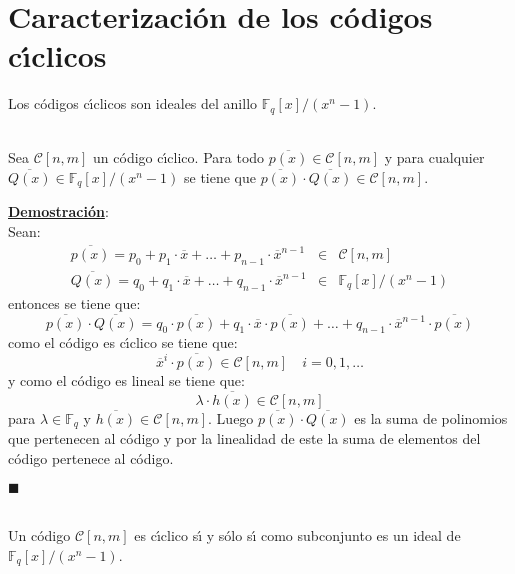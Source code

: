 %
%

\section{Caracterizaci\'on de los c\'odigos c\'{\i}clicos}

Los c\'odigos c\'{\i}clicos son ideales del anillo $\mathbb{F}_q[x]/(x^n-1)$.

\begin{proposicion}\label{pro:Ideal}
\ \\
Sea $\mathcal{C}[n,m]$ un c\'odigo c\'{\i}clico. Para todo $\overline{p(x)}\in
\mathcal{C}[n,m]$ y para cualquier $\overline{Q(x)}\in \mathbb{F}_q[x]/(x^n-1)$
se tiene que $\overline{p(x)}\cdot \overline{Q(x)}\in \mathcal{C}[n,m]$.
\end{proposicion}
\underline{\textbf{Demostraci\'on}}:\\
Sean:
\begin{eqnarray*}
\overline{p(x)}=p_0+p_1\cdot \overline{x}+\dots+p_{n-1}\cdot
\overline{x}^{n-1}&\in& \mathcal{C}[n,m]\\
\overline{Q(x)}=q_0+q_1\cdot \overline{x}+\dots+q_{n-1}\cdot
\overline{x}^{n-1}&\in& \mathbb{F}_q[x]/(x^n-1)
\end{eqnarray*}
entonces se tiene que:
\begin{displaymath}
\overline{p(x)}\cdot \overline{Q(x)} = q_0\cdot \overline{p(x)}+
q_1\cdot\overline{x}\cdot\overline{p(x)}+\dots+q_{n-1}\cdot\overline{x}^{n-1}
\cdot\overline{p(x)}
\end{displaymath}
como el c\'odigo es c\'{\i}clico se tiene que:
\begin{displaymath}
\overline{x}^i\cdot\overline{p(x)}\in \mathcal{C}[n,m]\quad i=0,1,\dots
\end{displaymath}
y como el c\'odigo es lineal se tiene que:
\begin{displaymath}
\lambda\cdot \overline{h(x)}\in\mathcal{C}[n,m]
\end{displaymath}
para $\lambda\in\mathbb{F}_q$ y $\overline{h(x)}\in \mathcal{C}[n,m]$. Luego
$\overline{p(x)}\cdot\overline{Q(x)}$ es la suma de polinomios que pertenecen
al c\'odigo y por la linealidad de este la suma de elementos del c\'odigo
pertenece al c\'odigo.
\begin{flushright}
$\blacksquare$
\end{flushright}
%
%
\begin{teorema}\label{the:CarCiclicos}
\ \\
Un c\'odigo $\mathcal{C}[n,m]$ es c\'{\i}clico s\'{\i} y s\'olo s\'{\i} como
subconjunto es un ideal de $\mathbb{F}_q[x]/(x^n-1)$.
\end{teorema}
